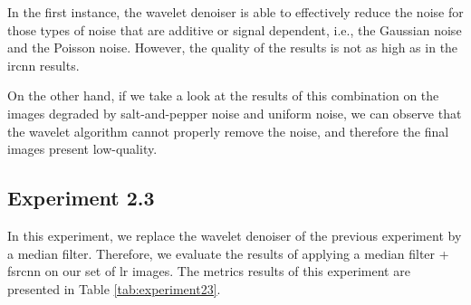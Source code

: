In the first instance, the wavelet denoiser is able to effectively reduce the noise for those types of noise that are additive or signal dependent, i.e., the Gaussian noise and the Poisson noise. However, the quality of the results is not as high as in the \gls{ircnn} results. 

On the other hand, if we take a look at the results of this combination on the images degraded by salt-and-pepper noise and uniform noise, we can observe that the wavelet algorithm cannot properly remove the noise, and therefore the final images present low-quality.

\subsection{Experiment 2.3}
In this experiment, we replace the wavelet denoiser of the previous experiment by a median filter. Therefore, we evaluate the results of applying a median filter + \gls{fsrcnn} on our set of \gls{lr} images. The metrics results of this experiment are presented in Table \ref{tab:experiment23}.

